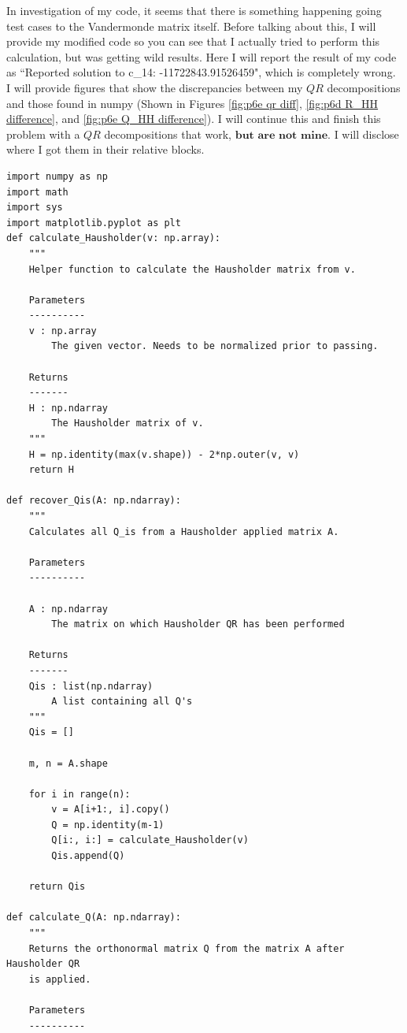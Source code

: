 \partbreak
\begin{solution}

    In investigation of my code, it seems that there is something happening going test cases to the Vandermonde matrix itself. Before talking about this, I will provide my modified code so you can see that I actually tried to perform this calculation, but was getting wild results. Here I will report the result of my code as ``Reported solution to c\_14: -11722843.91526459", which is completely wrong. I will provide figures that show the discrepancies between my $QR$ decompositions and those found in numpy (Shown in Figures \ref{fig:p6e qr diff}, \ref{fig:p6d R_HH difference}, and \ref{fig:p6e Q_HH difference}). I will continue this and finish this problem with a $QR$ decompositions that work, $\textbf{but are not mine}$. I will disclose where I got them in their relative blocks.

\newpage
\begin{lstlisting}
import numpy as np
import math
import sys
import matplotlib.pyplot as plt
def calculate_Hausholder(v: np.array):
    """
    Helper function to calculate the Hausholder matrix from v.
    
    Parameters
    ----------
    v : np.array
        The given vector. Needs to be normalized prior to passing.
        
    Returns
    -------
    H : np.ndarray
        The Hausholder matrix of v.
    """
    H = np.identity(max(v.shape)) - 2*np.outer(v, v)
    return H

def recover_Qis(A: np.ndarray):
    """
    Calculates all Q_is from a Hausholder applied matrix A.
    
    Parameters
    ----------
    
    A : np.ndarray
        The matrix on which Hausholder QR has been performed
        
    Returns
    -------
    Qis : list(np.ndarray)
        A list containing all Q's 
    """
    Qis = []
    
    m, n = A.shape
    
    for i in range(n):
        v = A[i+1:, i].copy()
        Q = np.identity(m-1)
        Q[i:, i:] = calculate_Hausholder(v)
        Qis.append(Q)
    
    return Qis

def calculate_Q(A: np.ndarray):
    """
    Returns the orthonormal matrix Q from the matrix A after Hausholder QR 
    is applied.
    
    Parameters
    ----------
    

\end{lstlisting}
\end{solution}
